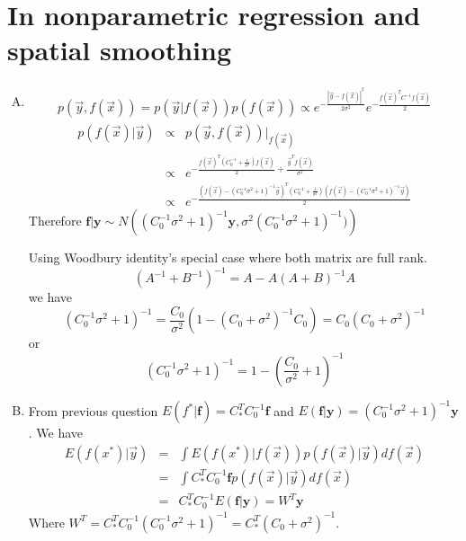 \documentclass{article}
\begin{document}
\section{In nonparametric regression and spatial smoothing}
\begin{enumerate}[(A)]
\item
\begin{eqnarray}
p(\vec{y},f(\vec{x}))=p(\vec{y}|f(\vec{x}))p(f(\vec{x}))\propto e^{-\frac{|\vec{y}-f(\vec{x})|^2}{2\sigma^2}}e^{-\frac{f(\vec{x})^TC^{-1}f(\vec{x})}{2}}
\end{eqnarray}
\begin{eqnarray}
p(f(\vec{x})|\vec{y})&\propto&p(\vec{y},f(\vec{x}))|_{f(\vec{x})}\nonumber\\
&\propto&e^{-\frac{f(\vec{x})^T(C_0^{-1}+\frac{1}{\sigma^2})f(\vec{x})}{2}+\frac{\vec{y}^Tf(\vec{x})}{\sigma^2}}\nonumber\\
&\propto&e^{-\frac{(f(\vec{x})-(C_0^{-1}\sigma^2+1)^{-1}\vec{y})^T(C_0^{-1}+\frac{1}{\sigma^2})(f(\vec{x})-(C_0^{-1}\sigma^2+1)^{-1}\vec{y})}{2}}
\end{eqnarray}
Therefore $\mathbf{f}|\mathbf{y}\sim N\left((C_0^{-1}\sigma^2+1)^{-1}\mathbf{y},\sigma^2(C_0^{-1}\sigma^2+1)^{-1})\right)$

Using Woodbury identity's special case where both matrix are full rank.
\[
(A^{-1}+B^{-1})^{-1}=A-A(A+B)^{-1}A
\]
we have
\[
(C_0^{-1}\sigma^2+1)^{-1}=\frac{C_0}{\sigma^2}\left(1-(C_0+\sigma^2)^{-1}C_0\right)=C_0(C_0+\sigma^2)^{-1}
\]
or
\[
(C_0^{-1}\sigma^2+1)^{-1}=1-(\frac{C_0}{\sigma^2}+1)^{-1}
\]

\item
From previous question $E(f^*|\mathbf{f})=C_*^TC_0^{-1}\mathbf{f}$ and $E(\mathbf{f}|\mathbf{y})=(C_0^{-1}\sigma^2+1)^{-1}\mathbf{y}$. We have
\begin{eqnarray}
E(f(x^*)|\vec{y})&=&\int E(f(x^*)|f(\vec{x}))p(f(\vec{x})|\vec{y})df(\vec{x})\nonumber\\
&=&\int C_*^TC_0^{-1}\mathbf{f}p(f(\vec{x})|\vec{y})df(\vec{x})\nonumber\\ 
&=&C_*^TC_0^{-1}E(\mathbf{f}|\mathbf{y})=W^T\mathbf{y}
\end{eqnarray}
Where $W^T=C_*^TC_0^{-1}(C_0^{-1}\sigma^2+1)^{-1}=C_*^T(C_0+\sigma^2)^{-1}$.


\end{enumerate}
\end{document}
